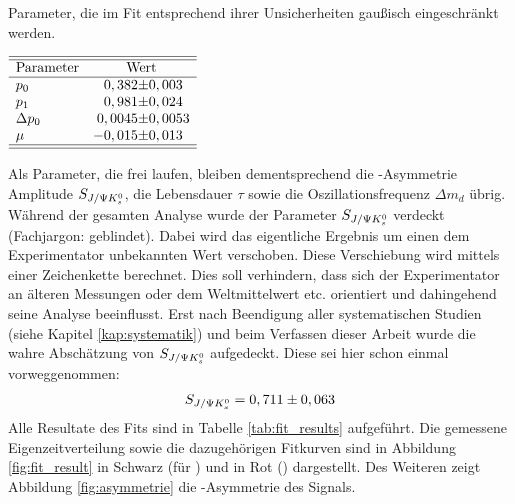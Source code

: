 \begin{table}[hptb]
\centering
\caption{Parameter, die im Fit entsprechend ihrer Unsicherheiten gaußisch eingeschränkt werden.}
\label{tab:constrained_parameters}
$\begin{array}{l r@{\pm}l }
\hline 
\hline
\text{Parameter} & \multicolumn{2}{c}{\text{Wert}}\\
\hline
p_0 & 0,382 & 0,003 \\
p_1 & 0,981 & 0,024 \\
\Delta p_0 & 0,0045 & 0,0053 \\
\mu & -0,015 & 0,013 \\ \hline \hline
\end{array}$ 
\end{table}
Als Parameter, die frei laufen, bleiben dementsprechend die \CP-Asymmetrie Amplitude $S_{J/\Psi K_s^0}$, die Lebensdauer $\tau$ sowie die Oszillationsfrequenz $\Delta m_d$ übrig. Während der gesamten Analyse wurde der Parameter $S_{J/\Psi K_s^0}$ verdeckt (Fachjargon: \glqq geblindet\grqq). Dabei wird das eigentliche Ergebnis um einen dem Experimentator unbekannten Wert verschoben. Diese Verschiebung wird mittels einer Zeichenkette berechnet. Dies soll verhindern, dass sich der Experimentator an älteren Messungen oder dem Weltmittelwert etc. orientiert und dahingehend seine Analyse beeinflusst. Erst nach Beendigung aller systematischen Studien (siehe Kapitel \ref{kap:systematik}) und beim Verfassen dieser Arbeit wurde die wahre Abschätzung von $S_{J/\Psi K_s^0}$ aufgedeckt. Diese sei hier schon einmal vorweggenommen:
\begin{align}
S_{J/\Psi K_s^0} = 0,711 \pm 0,063     \label{eq:fit_result}
\end{align}
Alle Resultate des Fits sind in Tabelle \ref{tab:fit_results} aufgeführt. Die gemessene Eigenzeitverteilung sowie die dazugehörigen Fitkurven sind in Abbildung \ref{fig:fit_result} in Schwarz (für \Bd) und in Rot (\Bdbar) dargestellt. Des Weiteren zeigt Abbildung \ref{fig:asymmetrie} die \CP-Asymmetrie des Signals.

